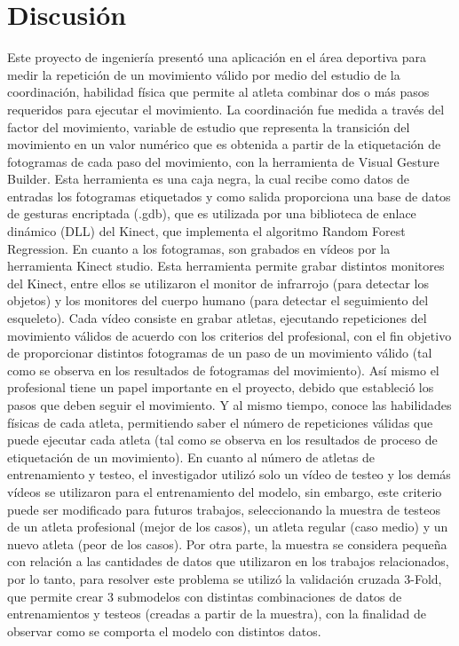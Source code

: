 \chapter{Discusi\'on}
Este proyecto de ingenier\'ia present\'o una aplicaci\'on en el \'area deportiva para medir la repetici\'on de un movimiento v\'alido por medio del estudio de la coordinaci\'on, habilidad f\'isica que permite al atleta combinar dos o m\'as pasos requeridos para ejecutar el movimiento. 
\medbreak
La coordinaci\'on fue medida a trav\'es del factor del movimiento, variable de estudio que representa la transici\'on del movimiento en un valor num\'erico que es obtenida a partir de la etiquetaci\'on de fotogramas de cada paso del movimiento, con la herramienta de Visual Gesture Builder.
\medbreak
Esta herramienta es una caja negra, la cual recibe como datos de entradas los fotogramas etiquetados y como salida proporciona una base de datos de gesturas encriptada (.gdb), que es utilizada por una biblioteca de enlace din\'amico (DLL) del Kinect, que implementa el algoritmo Random Forest Regression.
\medbreak
En cuanto a los fotogramas, son grabados en v\'ideos por la herramienta Kinect studio. Esta herramienta permite grabar distintos monitores del Kinect, entre ellos se utilizaron el monitor de infrarrojo (para detectar los objetos) y los monitores del cuerpo humano (para detectar el seguimiento del esqueleto).
\medbreak
Cada v\'ideo consiste en grabar atletas, ejecutando repeticiones del movimiento v\'alidos de acuerdo con los criterios del profesional, con el fin objetivo de proporcionar distintos fotogramas de un paso de un movimiento v\'alido (tal como se observa en los resultados de fotogramas del movimiento).
\medbreak
As\'i mismo el profesional tiene un papel importante en el proyecto, debido que estableci\'o los pasos que deben seguir el movimiento. Y al mismo tiempo, conoce las habilidades f\'isicas de cada atleta, permitiendo saber el n\'umero de repeticiones v\'alidas que puede ejecutar cada atleta (tal como se observa en los resultados de proceso de etiquetaci\'on de un movimiento).
\medbreak
En cuanto al n\'umero de atletas de entrenamiento y testeo, el investigador utiliz\'o solo un v\'ideo de testeo y los dem\'as v\'ideos se utilizaron para el entrenamiento del modelo, sin embargo, este criterio puede ser modificado para futuros trabajos, seleccionando la muestra de testeos de un atleta profesional (mejor de los casos), un atleta regular (caso medio) y un nuevo atleta (peor de los casos).
\medbreak
Por otra parte, la muestra se considera peque\~na con relaci\'on a las cantidades de datos que utilizaron en los trabajos relacionados, por lo tanto, para resolver este problema se utiliz\'o la validaci\'on cruzada 3-Fold, que permite crear 3 submodelos con distintas combinaciones de datos de entrenamientos y testeos (creadas a partir de la muestra), con la finalidad de observar como se comporta el modelo con distintos datos.
